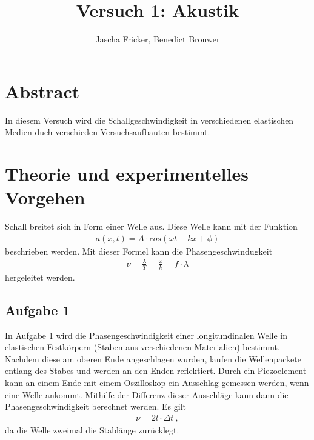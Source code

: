 \documentclass[11pt, a4paper]{article}
\title{Versuch 1: Akustik}
\author{Jascha Fricker, Benedict Brouwer}
\begin{document}
    \maketitle

    \section{Abstract}
    In diesem Versuch wird die Schallgeschwindigkeit in verschiedenen elastischen Medien
    duch verschieden Versuchsaufbauten bestimmt.
    
    \section{Theorie und experimentelles Vorgehen}
    Schall breitet sich in Form einer Welle aus. Diese Welle kann mit der Funktion
    \begin{align}
        a(x, t) = A \cdot cos(\omega t-kx+\phi )
    \end{align}
    beschrieben werden. Mit dieser Formel kann die Phasengeschwindugkeit
    \begin{align}
        \nu = \frac{\lambda}{T} = \frac{\omega}{k} = f \cdot \lambda
    \end{align}
    hergeleitet werden. \\
    \subsection{Aufgabe 1}
    In Aufgabe 1 wird die Phasengeschwindigkeit einer longitundinalen Welle in elastischen Festkörpern (Staben aus verschiedenen Materialien) bestimmt.
    Nachdem diese am oberen Ende angeschlagen wurden, laufen die Wellenpackete entlang des Stabes und werden an den Enden reflektiert.
    Durch ein Piezoelement kann an einem Ende mit einem Oszilloskop ein Ausschlag gemessen werden, wenn eine Welle ankommt.
    Mithilfe der Differenz dieser Ausschläge kann dann die Phasengeschwindigkeit berechnet werden. Es gilt
    \begin{align}
        \nu = 2l \cdot \Delta t \ ,
    \end{align}
    da die Welle zweimal die Stablänge zurücklegt.
\end{document}

